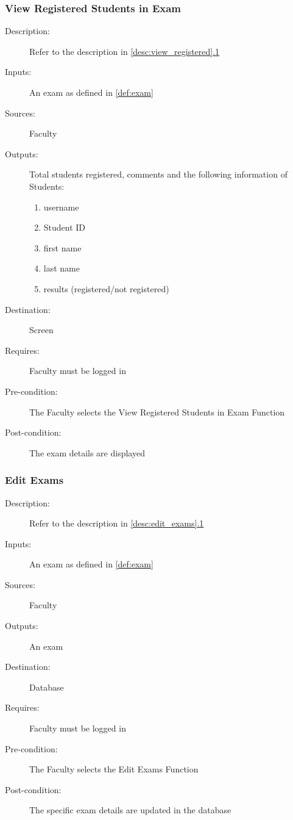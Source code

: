 \subsubsection{\large View Registered Students in Exam} 
\begin{boxed} %
\begin{description}
\item[Description:]
   Refer to the description in \autoref{desc:view_registered}\hyperref[desc:view_registered]{.1}
\item[Inputs:]
   An exam as defined in \autoref{def:exam}
\item[Sources:]
   Faculty
\item[Outputs:]
   Total students registered, comments and the following information of
   Students:
   \begin{enumerate}
      \item username
      \item Student ID
      \item first name
      \item last name
      \item results (registered/not registered)
   \end{enumerate}
\item[Destination:]
   Screen
\item[Requires:]
   Faculty must be logged in
\item[Pre-condition:]
   The Faculty selects the View Registered Students in Exam Function
\item[Post-condition:]
   The exam details are displayed
\end{description}
\end{boxed} %

\subsubsection{\large Edit Exams} 
\begin{boxed} %
\begin{description}
\item[Description:]
   Refer to the description in \autoref{desc:edit_exams}\hyperref[desc:edit_exams]{.1}
\item[Inputs:]
   An exam as defined in \autoref{def:exam}
\item[Sources:]
   Faculty
\item[Outputs:]
   An exam
\item[Destination:]
   Database
\item[Requires:]
   Faculty must be logged in
\item[Pre-condition:]
   The Faculty selects the Edit Exams Function
\item[Post-condition:]
   The specific exam details are updated in the database
\end{description}
\end{boxed} %

